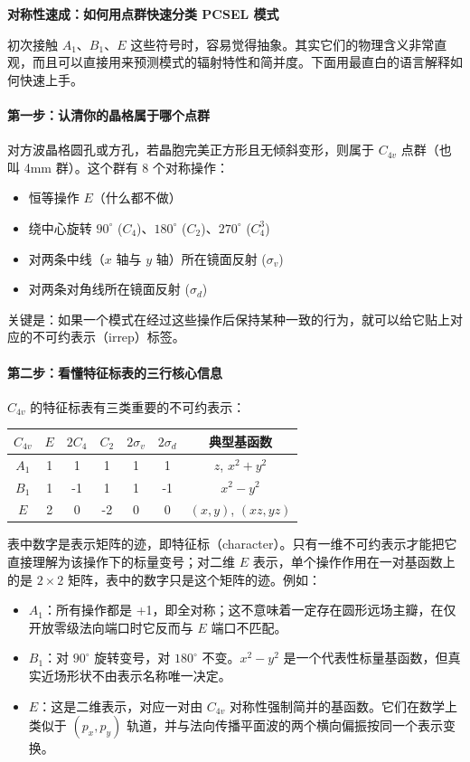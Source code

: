 \begin{SymmetryQuick}
\textbf{对称性速成：如何用点群快速分类 PCSEL 模式}

初次接触 $A_1$、$B_1$、$E$ 这些符号时，容易觉得抽象。其实它们的物理含义非常直观，而且可以直接用来预测模式的辐射特性和简并度。下面用最直白的语言解释如何快速上手。

\paragraph{第一步：认清你的晶格属于哪个点群}
对方波晶格圆孔或方孔，若晶胞完美正方形且无倾斜变形，则属于 $C_{4v}$ 点群（也叫 4mm 群）。这个群有 8 个对称操作：
\begin{itemize}
  \item 恒等操作 $E$（什么都不做）
  \item 绕中心旋转 $90^\circ$ ($C_4$)、$180^\circ$ ($C_2$)、$270^\circ$ ($C_4^3$)
  \item 对两条中线（$x$ 轴与 $y$ 轴）所在镜面反射 ($\sigma_v$)
  \item 对两条对角线所在镜面反射 ($\sigma_d$)
\end{itemize}
关键是：如果一个模式在经过这些操作后保持某种一致的行为，就可以给它贴上对应的不可约表示（irrep）标签。

\paragraph{第二步：看懂特征标表的三行核心信息}
$C_{4v}$ 的特征标表有三类重要的不可约表示：
\begin{center}
\begin{tabular}{c|ccccc|c}
  $C_{4v}$ & $E$ & $2C_4$ & $C_2$ & $2\sigma_v$ & $2\sigma_d$ & 典型基函数 \\
  \hline
  $A_1$ & 1 & 1 & 1 & 1 & 1 & $z$, $x^2+y^2$ \\
  $B_1$ & 1 & -1 & 1 & 1 & -1 & $x^2-y^2$ \\
  $E$   & 2 & 0 & -2 & 0 & 0 & $(x,y)$, $(xz,yz)$ \\
\end{tabular}
\end{center}
表中数字是表示矩阵的迹，即特征标（character）。只有一维不可约表示才能把它直接理解为该操作下的标量变号；对二维 $E$ 表示，单个操作作用在一对基函数上的是 $2\times2$ 矩阵，表中的数字只是这个矩阵的迹。例如：
\begin{itemize}
  \item $A_1$：所有操作都是 +1，即全对称；这不意味着一定存在圆形远场主瓣，在仅开放零级法向端口时它反而与 $E$ 端口不匹配。
  \item $B_1$：对 $90^\circ$ 旋转变号，对 $180^\circ$ 不变。$x^2-y^2$ 是一个代表性标量基函数，但真实近场形状不由表示名称唯一决定。
  \item $E$：这是二维表示，对应一对由 $C_{4v}$ 对称性强制简并的基函数。它们在数学上类似于 $(p_x,p_y)$ 轨道，并与法向传播平面波的两个横向偏振按同一个表示变换。
\end{itemize}


\end{SymmetryQuick}
